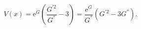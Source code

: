 \begin{equation}\label{V1}
 V(x) = \mathrm{e}^{G}(\frac{G^{'2}}{G^{''}}-3) =
 \frac{\mathrm{e}^{G}}{G^{''}}(G^{'2}-3G^{''}).
\end{equation}

